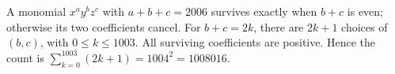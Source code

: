 A monomial $x^ay^bz^c$ with $a+b+c=2006$ survives exactly when $b+c$ is even; otherwise its two coefficients cancel. For $b+c=2k$, there are $2k+1$ choices of $(b,c)$, with $0\le k\le1003$. All surviving coefficients are positive. Hence the count is $\sum_{k=0}^{1003}(2k+1)=1004^2=\boxed{1008016}$.
